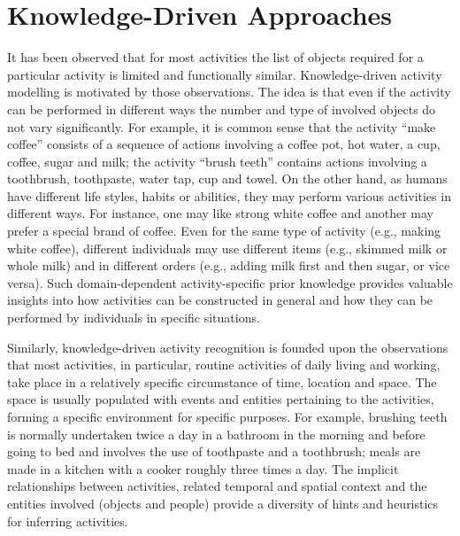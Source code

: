 \section{Knowledge-Driven Approaches}
\label{sec:soa:knowledgedriven}

It has been observed that for most activities the list of objects required for a particular activity is limited and functionally similar. Knowledge-driven activity modelling is motivated by those observations. The idea is that even if the activity can be performed in different ways the number and type of involved objects do not vary significantly. For example, it is common sense that the activity “make coffee” consists of a sequence of actions involving a coffee pot, hot water, a cup, coffee, sugar and milk; the activity “brush teeth” contains actions involving a toothbrush, toothpaste, water tap, cup and towel. On the other hand, as humans have different life styles, habits or abilities, they may perform various activities in different ways. For instance, one may like strong white coffee and another may prefer a special brand of coffee. Even for the same type of activity (e.g., making white coffee), different individuals may use different items (e.g., skimmed milk or whole milk) and in different orders (e.g., adding milk first and then sugar, or vice versa). Such domain-dependent activity-specific prior knowledge provides valuable insights into how activities can be constructed in general and how they can be performed by individuals in specific situations.

Similarly, knowledge-driven activity recognition is founded upon the observations that most activities, in particular, routine activities of daily living and working, take place in a relatively specific circumstance of time, location and space. The space is usually populated with events and entities pertaining to the activities, forming a specific environment for specific purposes. For example, brushing teeth is normally undertaken twice a day in a bathroom in the morning and before going to bed and involves the use of toothpaste and a toothbrush; meals are made in a kitchen with a cooker roughly three times a day. The implicit relationships between activities, related temporal and spatial context and the entities involved (objects and people) provide a diversity of hints and heuristics for inferring activities.


